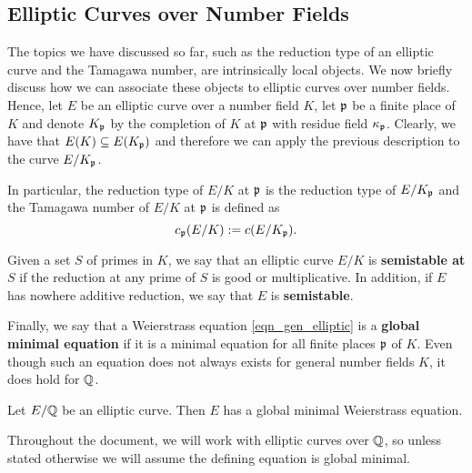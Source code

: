
\subsection{Elliptic Curves over Number Fields}

The topics we have discussed so far, such as the reduction type of an elliptic curve and the Tamagawa number, are intrinsically local objects. We now briefly discuss how we can associate these objects to elliptic curves over number fields. Hence, let $E$ be an elliptic curve over a number field $K$, let $\mathfrak{p}$ be a finite place of $K$ and denote $K_{\mathfrak{p}}$ by the completion of $K$ at $\mathfrak{p}$ with residue field $\kappa_{\mathfrak{p}}$. Clearly, we have that $E(K)\subseteq E(K_{\mathfrak{p}})$ and therefore we can apply the previous description to the curve $E/K_{\mathfrak{p}}$.

In particular, the reduction type of $E/K$ at $\mathfrak{p}$ is the reduction type of $E/K_{\mathfrak{p}}$ and the Tamagawa number of $E/K$ at $\mathfrak{p}$ is defined as 
$$c_{\mathfrak{p}}(E/K):=c(E/K_{\mathfrak{p}}).$$

\begin{defn}
Given a set $S$ of primes in $K$, we say that an elliptic curve $E/K$ is \textbf{semistable at $S$}  if the reduction at any prime of $S$ is good or multiplicative. In addition, if $E$ has nowhere additive reduction, we say that $E$ is \textbf{semistable}.
\end{defn}



Finally, we say that a Weierstrass equation \eqref{eqn_gen_elliptic} is a \textbf{global minimal equation} if it is a minimal equation for all finite places $\mathfrak{p}$ of $K$. Even though such an equation does not always exists for general number fields $K$, it does hold for $\mathbb{Q}$.

\begin{prop}\cite[\S VIII, Corollary 8.3]{S1}\label{prop_globmin}
    Let $E/\mathbb{Q}$ be an elliptic curve. Then $E$ has a global minimal Weierstrass equation.
\end{prop}

Throughout the document, we will work with elliptic curves over $\mathbb{Q}$, so unless stated otherwise we will assume the defining equation is global minimal.
